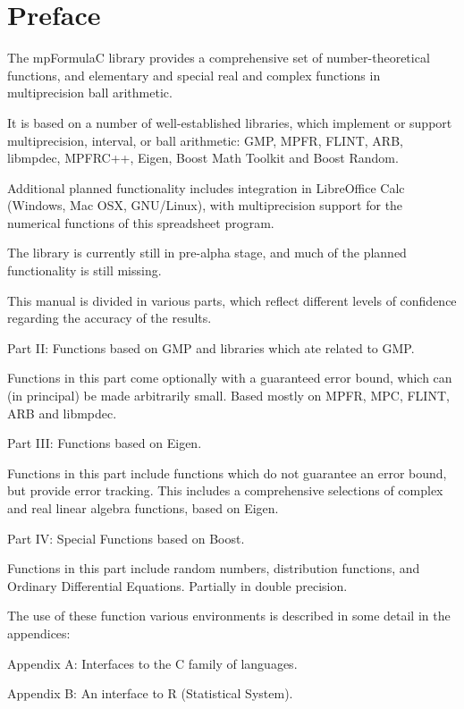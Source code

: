 \chapter{Preface}
\label{Preface} 

The mpFormulaC library provides a comprehensive set of number-theoretical functions, and elementary and special real and complex functions in multiprecision ball arithmetic. 

\vpara
It is based on a number of well-established libraries, which implement or support multiprecision, interval, or ball arithmetic: GMP, MPFR, FLINT, ARB, libmpdec, MPFRC++, Eigen, Boost Math Toolkit and Boost Random. 

\vpara
Additional planned functionality includes integration in LibreOffice Calc (Windows, Mac OSX, GNU/Linux), with multiprecision support for the numerical functions of this spreadsheet program. 

\vpara
The library is currently still in pre-alpha stage, and much of the planned functionality is still missing.

\vpara

\vpara
This manual is divided in various parts, which reflect different levels of confidence regarding the accuracy of the results.

\vpara
Part II: Functions based on GMP and libraries which ate related to GMP.

Functions in this part come optionally with a guaranteed error bound, which can (in principal) be made arbitrarily small.  Based mostly on MPFR, MPC, FLINT, ARB and libmpdec.

\vpara
Part III: Functions based on Eigen.

Functions in this part include functions which do not guarantee an error bound, but provide error tracking. This includes a comprehensive selections of complex and real linear algebra functions, based on Eigen.

\vpara
Part IV: Special Functions based on Boost.

Functions in this part include random numbers, distribution functions, and Ordinary Differential Equations. Partially in double precision.


\vpara
The use of these function various environments is described in some detail in the appendices:

\vpara
Appendix A:  Interfaces to the C family of languages.

\vpara
Appendix B:  An interface to R (Statistical System).

